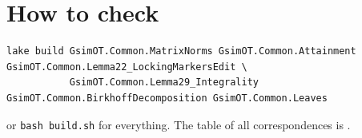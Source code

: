 \section{How to check}
\begin{verbatim}
lake build GsimOT.Common.MatrixNorms GsimOT.Common.Attainment GsimOT.Common.Lemma22_LockingMarkersEdit \
           GsimOT.Common.Lemma29_Integrality GsimOT.Common.BirkhoffDecomposition GsimOT.Common.Leaves
\end{verbatim}
or \texttt{bash build.sh} for everything. The table of all correspondences is .

